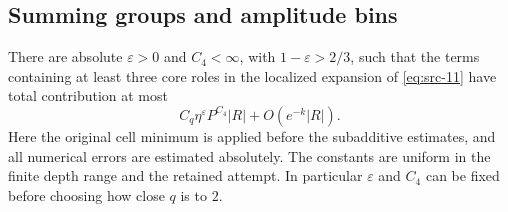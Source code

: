\subsection{Summing groups and amplitude bins}

\begin{proposition}
\label{prop:core-estimate}
There are absolute $\varepsilon>0$ and $C_4<\infty$, with
$1-\varepsilon>2/3$, such that the terms containing at least three
core roles in the localized expansion of \eqref{eq:src-11} have
total contribution at most
\begin{equation*}
 C_q\eta^\varepsilon P^{C_4}|R|+O(e^{-k}|R|).
 \tag{37}\label{eq:src-37}
\end{equation*}
Here the original cell minimum is applied before the subadditive
estimates, and all numerical errors are estimated absolutely.
The constants are uniform in the finite depth range and the
retained attempt.  In particular $\varepsilon$ and $C_4$ can be
fixed before choosing how close $q$ is to $2$.
\end{proposition}

